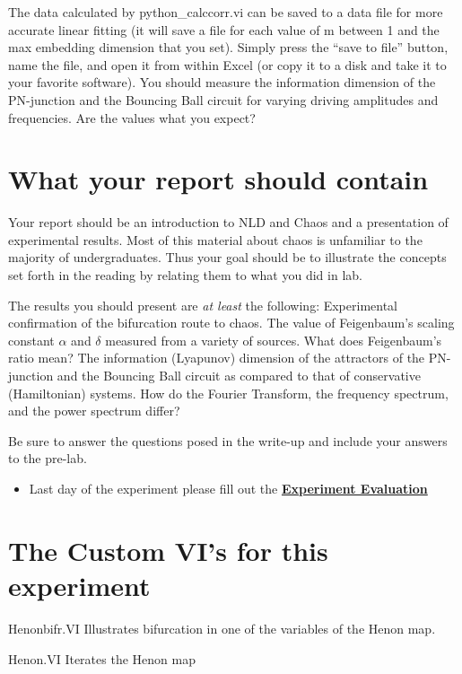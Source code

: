 \documentclass{../lab}
\begin{document}
The data calculated by python\_calccorr.vi can be saved to a data file for more accurate linear fitting (it will save a file for each value of m between 1 and the max embedding dimension that you set). Simply press the ``save to file'' button, name the file, and open it from within Excel (or copy it to a disk and take it to your favorite software). You should measure the information dimension of the PN-junction and the Bouncing Ball circuit for varying driving amplitudes and frequencies. Are the values what you expect?

\section{What your report should contain}

Your report should be an introduction to NLD and Chaos and a presentation of experimental results. Most of this material about chaos is unfamiliar to the majority of undergraduates. Thus your goal should be to illustrate the concepts set forth in the reading by relating them to what you did in lab.

The results you should present are \emph{at least} the following: Experimental confirmation of the bifurcation route to chaos. The value of Feigenbaum's scaling constant $\alpha$ and $\delta$ measured from a variety of sources. What does Feigenbaum's ratio mean? The information (Lyapunov) dimension of the attractors of the PN-junction and the Bouncing Ball circuit as compared to that of conservative (Hamiltonian) systems. How do the Fourier Transform, the frequency spectrum, and the power spectrum differ?

Be sure to answer the questions posed in the write-up and include your answers to the pre-lab.

\begin{itemize}
    \item Last day of the experiment please fill out the \href{\ExperimentEvaluation}{\textbf{Experiment Evaluation}}

\end{itemize}

\section{The Custom VI's for this experiment}

Henonbifr.VI Illustrates bifurcation in one of the variables of the Henon map.

Henon.VI Iterates the Henon map
\end{document}
